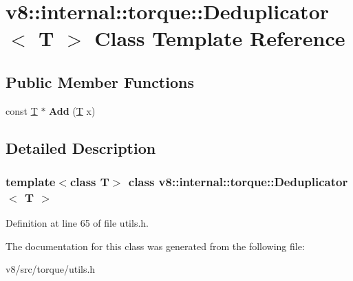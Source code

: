 \hypertarget{classv8_1_1internal_1_1torque_1_1Deduplicator}{}\section{v8\+:\+:internal\+:\+:torque\+:\+:Deduplicator$<$ T $>$ Class Template Reference}
\label{classv8_1_1internal_1_1torque_1_1Deduplicator}
\subsection*{Public Member Functions}
\begin{DoxyCompactItemize}
\item 
\mbox{\label{classv8_1_1internal_1_1torque_1_1Deduplicator_aa549e0c29dacce690d1455e71d0e92ab}} 
const \mbox{\hyperlink{classv8_1_1internal_1_1torque_1_1T}{T}} $\ast$ {\bfseries Add} (\mbox{\hyperlink{classv8_1_1internal_1_1torque_1_1T}{T}} x)
\end{DoxyCompactItemize}


\subsection{Detailed Description}
\subsubsection*{template$<$class T$>$\newline
class v8\+::internal\+::torque\+::\+Deduplicator$<$ T $>$}



Definition at line 65 of file utils.\+h.



The documentation for this class was generated from the following file\+:\begin{DoxyCompactItemize}
\item 
v8/src/torque/utils.\+h\end{DoxyCompactItemize}
